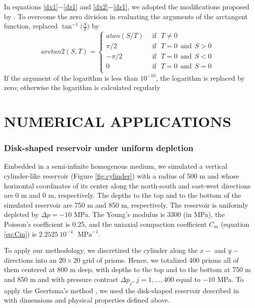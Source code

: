 \documentclass[journal abbreviation, manuscript]{copernicus}
\begin{document}
In equations \ref{dx1}$-$\ref{dz1} and \ref{dx2}$-$\ref{dz1}, we adopted the modifications proposed by \cite{Fukushima2020}.
To overcome the zero division in evaluating the arguments of the arctangent function, \cite{Fukushima2020} replaced  $\tan^{-1} \big( \frac{S}{T} \big)$ by 
\begin{equation}
arctan2(S,T) = 
  \left\{ \begin{aligned}
      atan (S/T) & \:\: \mbox{if} \: \:\:  T \neq 0 \\
      \pi /2 & \:\: \mbox{if} \: \:\:  T = 0  \: \: \mbox{and} \: \:S > 0 \\
      -\pi /2 & \:\: \mbox{if} \: \:\:  T = 0  \: \: \mbox{and} \: \:S < 0 \\
         0 & \:\: \mbox{if} \: \:\:  T = 0  \: \: \mbox{and} \: \:S = 0 \\
  \end{aligned} \right.
\label{eq:arctan2}  
\end{equation}
If the argument of the logarithm is less than $10^{-10}$, the logarithm is replaced by zero; otherwise the logarithm is  calculated regularly



\section{NUMERICAL APPLICATIONS}

\subsubsection{Disk-shaped reservoir under uniform depletion}

Embedded in a semi-infinite homogenous medium, we simulated a vertical cylinder-like reservoir (Figure \ref{fig:cylinder}) with a radius of 500 m and whose horizontal coordinates of its center along the north-south and east-west directions are 0 m and 0 m, respectively.
The depths to the top and to the bottom of the simulated reservoir are 750 m and 850 m, respectively.
The reservoir is uniformly depleted by $\Delta p = -10$ MPa. 
The Young’s modulus is  3300 (in MPa), the Poisson's coefficient is 0.25, and
the uniaxial compaction coefficient $C_{m}$  (equation \ref{eq:Cm}) is $2.2525 \: 10^{-4}$
$\textrm{ MPa}^{-1}$.



To apply our methodology, we  discretized the cylinder  along the $x-$ and $y-$ directions into an $20 \times 20$ grid of prisms. Hence, we totalized 400 prisms all of them centered at 800 m deep, with depths to the top and to the bottom at 750 m and 850 m  and with pressure contrast $\Delta p_j$, $j = 1, ..., 400$ equal to $-10$ MPa.
To apply the Geertsma’s method \citep{Geertsma73}, we used the disk-shaped reservoir described in \cite{Fjaer08} with dimensions and physical properties defined above.
 
\end{document}
